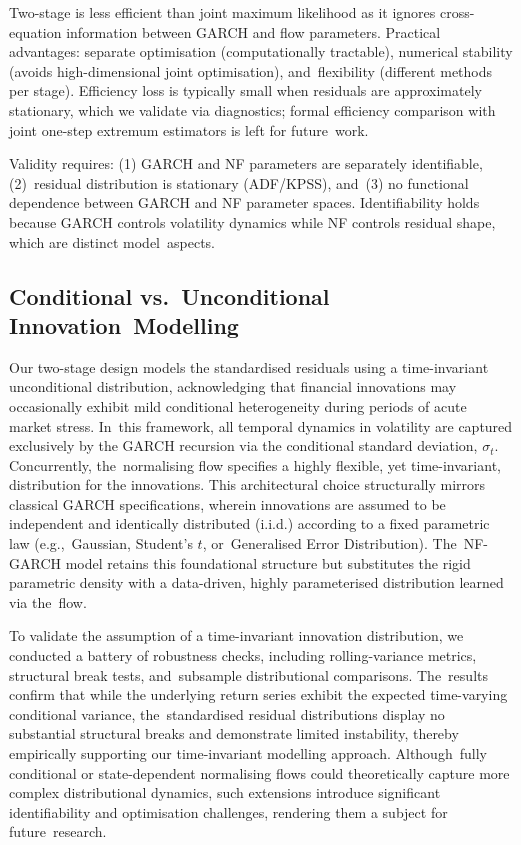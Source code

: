 \documentclass[risks,article,accept,pdftex,moreauthors]{Definitions/mdpi}
\begin{document}
Two-stage is less efficient than joint maximum likelihood as it ignores cross-equation information between GARCH and flow parameters. Practical advantages: separate optimisation (computationally tractable), numerical stability (avoids high-dimensional joint optimisation), and~flexibility (different methods per stage). Efficiency loss is typically small when residuals are approximately stationary, which we validate via diagnostics; formal efficiency comparison with joint one-step extremum estimators is left for future~work.

Validity requires: (1) GARCH and NF parameters are separately identifiable, (2)~residual distribution is stationary (ADF/KPSS), and~(3) no functional dependence between GARCH and NF parameter spaces. Identifiability holds because GARCH controls volatility dynamics while NF controls residual shape, which are distinct model~aspects.

\subsection{Conditional vs.\ Unconditional Innovation~Modelling}
\label{subsec:conditional_vs_unconditional}
Our two-stage design models the standardised residuals using a time-invariant unconditional distribution, acknowledging that financial innovations may occasionally exhibit mild conditional heterogeneity during periods of acute market stress. In~this framework, all temporal dynamics in volatility are captured exclusively by the GARCH recursion via the conditional standard deviation, $\sigma_t$. Concurrently, the~normalising flow specifies a highly flexible, yet time-invariant, distribution for the innovations. This architectural choice structurally mirrors classical GARCH specifications, wherein innovations are assumed to be independent and identically distributed (i.i.d.) according to a fixed parametric law (e.g.,~Gaussian, Student's $t$, or~Generalised Error Distribution). The~NF-GARCH model retains this foundational structure but substitutes the rigid parametric density with a data-driven, highly parameterised distribution learned via the~flow. 

To validate the assumption of a time-invariant innovation distribution, we conducted a battery of robustness checks, including rolling-variance metrics, structural break tests, and~subsample distributional comparisons. The~results confirm that while the underlying return series exhibit the expected time-varying conditional variance, the~standardised residual distributions display no substantial structural breaks and demonstrate limited instability, thereby empirically supporting our time-invariant modelling approach. Although~fully conditional or state-dependent normalising flows could theoretically capture more complex distributional dynamics, such extensions introduce significant identifiability and optimisation challenges, rendering them a subject for future~research.
\end{document}
